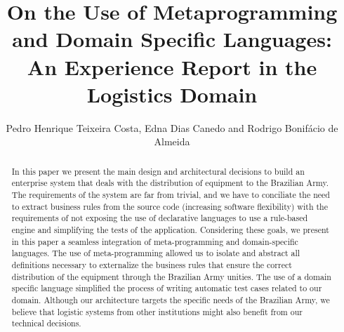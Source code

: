 \documentclass[sigconf]{acmart}
\begin{document}
\title[On the Use of Metaprogramming and DSL: An Experience Report]{On the Use of Metaprogramming and Domain Specific Languages: An Experience Report in the Logistics Domain} 


\author{Pedro Henrique Teixeira Costa, Edna Dias Canedo and Rodrigo Bonif\'{a}cio de Almeida}

\renewcommand{\shortauthors}{-}

\newcommand{\callers}{\emph{high-level rules}\xspace}
\newcommand{\shc}{HLR\xspace}
\newcommand{\hlrdsl}{\textsc{HLRDsl}\xspace}

\begin{abstract}
In this paper we present the main design and architectural decisions to build an enterprise system that deals with the distribution of equipment to the Brazilian Army. The requirements of the system are far from trivial, and we have to conciliate the need to extract business rules from the source code (increasing software flexibility) with the requirements of not exposing the use of declarative languages to use a rule-based engine and simplifying the tests of the application. Considering these goals, we present in this paper a seamless integration of meta-programming and domain-specific languages. The use of meta-programming allowed us to isolate and abstract all definitions necessary to externalize the business rules that ensure the correct distribution of the equipment through the Brazilian Army unities. The use of a domain specific language simplified the process of writing automatic test cases related to our domain. Although our architecture targets the specific needs of the Brazilian Army, we believe that logistic systems from other institutions might also benefit from our technical decisions.
\end{abstract}
\end{document}
